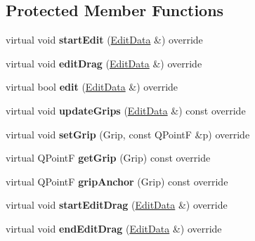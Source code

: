 \subsection*{Protected Member Functions}
\begin{DoxyCompactItemize}
\item 
\mbox{\label{class_ms_1_1_line_segment_a4593bf738467d8910ecf0092e6910a79}} 
virtual void {\bfseries start\+Edit} (\hyperlink{class_ms_1_1_edit_data}{Edit\+Data} \&) override
\item 
\mbox{\label{class_ms_1_1_line_segment_a011e9575c5c7219b4dfd7d722ed1cda4}} 
virtual void {\bfseries edit\+Drag} (\hyperlink{class_ms_1_1_edit_data}{Edit\+Data} \&) override
\item 
\mbox{\label{class_ms_1_1_line_segment_a999066c0c7b3acafce25c92273184d20}} 
virtual bool {\bfseries edit} (\hyperlink{class_ms_1_1_edit_data}{Edit\+Data} \&) override
\item 
\mbox{\label{class_ms_1_1_line_segment_a2f82ae71fc34d562625a7fa1101f8869}} 
virtual void {\bfseries update\+Grips} (\hyperlink{class_ms_1_1_edit_data}{Edit\+Data} \&) const override
\item 
\mbox{\label{class_ms_1_1_line_segment_ac1de227cb6adaffb6a9a7a5ddaf42c18}} 
virtual void {\bfseries set\+Grip} (Grip, const Q\+PointF \&p) override
\item 
\mbox{\label{class_ms_1_1_line_segment_a46326ec41465395be5d84bb2f3cd46a3}} 
virtual Q\+PointF {\bfseries get\+Grip} (Grip) const override
\item 
\mbox{\label{class_ms_1_1_line_segment_a4e08a6225945c4c1d10423adf327f141}} 
virtual Q\+PointF {\bfseries grip\+Anchor} (Grip) const override
\item 
\mbox{\label{class_ms_1_1_line_segment_a45ade1c83e4466f142137ba472142082}} 
virtual void {\bfseries start\+Edit\+Drag} (\hyperlink{class_ms_1_1_edit_data}{Edit\+Data} \&) override
\item 
\mbox{\label{class_ms_1_1_line_segment_af3c1b3c9de57485a10ac96ad5deb2b41}} 
virtual void {\bfseries end\+Edit\+Drag} (\hyperlink{class_ms_1_1_edit_data}{Edit\+Data} \&) override
\end{DoxyCompactItemize}
